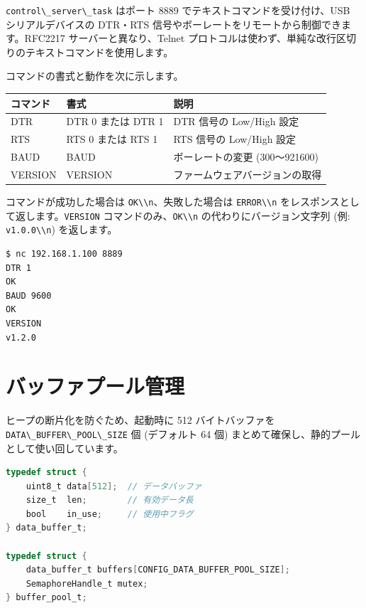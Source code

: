 \documentclass[10pt,twoside,openany,a4j]{ltjsbook}
\newcommand{\passthrough}[1]{#1}
\begin{document}
\passthrough{\lstinline!control\_server\_task!} はポート 8889
でテキストコマンドを受け付け、USB シリアルデバイスの DTR・RTS
信号やボーレートをリモートから制御できます。RFC2217
サーバーと異なり、Telnet
プロトコルは使わず、単純な改行区切りのテキストコマンドを使用します。

コマンドの書式と動作を次に示します。

\begin{longtable}[]{@{}lll@{}}
\toprule\noalign{}
コマンド & 書式 & 説明 \\
\midrule\noalign{}
\endhead
\bottomrule\noalign{}
\endlastfoot
DTR & DTR 0 または DTR 1 & DTR 信号の Low/High 設定 \\
RTS & RTS 0 または RTS 1 & RTS 信号の Low/High 設定 \\
BAUD & BAUD & ボーレートの変更 (300〜921600) \\
VERSION & VERSION & ファームウェアバージョンの取得 \\
\end{longtable}

コマンドが成功した場合は \passthrough{\lstinline!OK\\n!}、失敗した場合は
\passthrough{\lstinline!ERROR\\n!}
をレスポンスとして返します。\passthrough{\lstinline!VERSION!}
コマンドのみ、\passthrough{\lstinline!OK\\n!} の代わりにバージョン文字列
(例: \passthrough{\lstinline!v1.0.0\\n!}) を返します。

\begin{lstlisting}
$ nc 192.168.1.100 8889
DTR 1
OK
BAUD 9600
OK
VERSION
v1.2.0
\end{lstlisting}

\section{バッファプール管理}\label{ux30d0ux30c3ux30d5ux30a1ux30d7ux30fcux30ebux7ba1ux7406}

ヒープの断片化を防ぐため、起動時に 512 バイトバッファを
\passthrough{\lstinline!DATA\_BUFFER\_POOL\_SIZE!} 個 (デフォルト 64 個)
まとめて確保し、静的プールとして使い回しています。

\begin{lstlisting}[language=C]
typedef struct {
    uint8_t data[512];  // データバッファ
    size_t  len;        // 有効データ長
    bool    in_use;     // 使用中フラグ
} data_buffer_t;

typedef struct {
    data_buffer_t buffers[CONFIG_DATA_BUFFER_POOL_SIZE];
    SemaphoreHandle_t mutex;
} buffer_pool_t;
\end{lstlisting}
\end{document}
